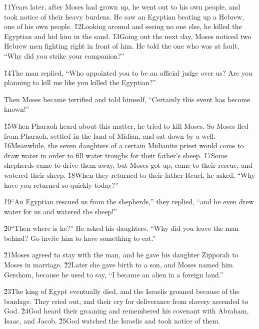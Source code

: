 \v{11}Years later, after Moses had grown up, he went out to his own people, and took notice of their heavy burdens. He saw an Egyptian beating up a Hebrew, one of his own people. \v{12}Looking around and seeing no one else, he killed the Egyptian and hid him in the sand. \v{13}Going out the next day, Moses noticed two Hebrew men fighting right in front of him. He told the one who was at fault, ``Why did you strike your companion?''

\v{14}The man replied, ``Who appointed you to be an official judge over us? Are you planning to kill me like you killed the Egyptian?''

Then Moses became terrified and told himself, ``Certainly this event has become known!''

\v{15}When Pharaoh heard about this matter, he tried to kill Moses. So Moses fled from Pharaoh, settled in the land of Midian, and sat down by a well. \v{16}Meanwhile, the seven daughters of a certain Midianite priest would come to draw water in order to fill water troughs for their father's sheep. \v{17}Some shepherds came to drive them away, but Moses got up, came to their rescue, and watered their sheep. \v{18}When they returned to their father Reuel, he asked, ``Why have you returned so quickly today?''

\v{19}``An Egyptian rescued us from the shepherds,'' they replied, ``and he even drew water for us and watered the sheep!''

\v{20}``Then where is he?'' He asked his daughters. ``Why did you leave the man behind? Go invite him to have something to eat.''

\v{21}Moses agreed to stay with the man, and he gave his daughter Zipporah to Moses in marriage. \v{22}Later she gave birth to a son, and Moses named him Gershom, because he used to say, ``I became an alien in a foreign land.''

\v{23}The king of Egypt eventually died, and the Israelis groaned because of the bondage. They cried out, and their cry for deliverance from slavery ascended to God. \v{24}God heard their groaning and remembered his covenant with Abraham, Isaac, and Jacob. \v{25}God watched the Israelis and took notice of them.

